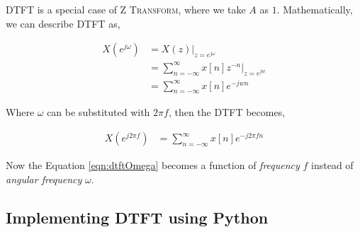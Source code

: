 \documentclass[../../course]{subfiles}
\begin{document}
\textsc{DTFT} is a special case of \textsc{Z Transform}, where we take $A$
as $1$. Mathematically, we can describe \textsc{DTFT} as,

\begin{align}
    X(e^{j \omega}) &= X(z) |_{z = e^{j \omega}} \\
    &= \sum_{n = - \infty}^{\infty} x[n] z^{-n} \Big|_{z = e^{jw}} \\
    &= \sum_{n = - \infty}^{\infty} x[n] e^{-j w n} \label{eqn:dtftOmega}
\end{align}

Where $\omega$ can be substituted with $2 \pi f$, then the \textsc{DTFT} becomes,

\begin{align}
    X(e^{j 2 \pi f}) &= \sum_{n = - \infty}^{\infty} x[n] e^{-j 2 \pi f n}
\end{align}

Now the Equation \ref{eqn:dtftOmega} becomes a function of \emph{frequency} $f$
instead of \emph{angular frequency} $\omega$.

\subsection{Implementing DTFT using Python}




%
%
%
%
%
%
%
\end{document}
